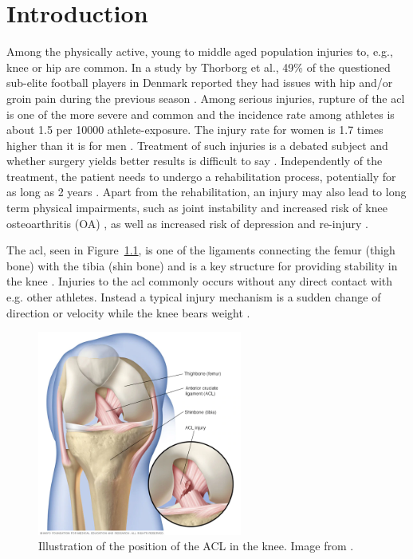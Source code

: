\chapter{Introduction} \label{ch:intro}
Among the physically active, young to middle aged population injuries to, e.g., knee or hip are common. In a study by Thorborg et al., 49\% of the questioned sub-elite football players in Denmark reported they had issues with hip and/or groin pain during the previous season \cite{Thorborg2017}. Among serious injuries, rupture of the \gls{acl} is one of the more severe and common and the incidence rate among athletes is about 1.5 per 10000 athlete-exposure. The injury rate for women is 1.7 times higher than it is for men \cite{Montalvo2019}. Treatment of such injuries is a debated subject and whether surgery yields better results is difficult to say \cite{Krause2018, Monk2016}. Independently of the treatment, the patient needs to undergo a rehabilitation process, potentially for as long as 2 years \cite{Nagelli2017}.
Apart from the rehabilitation, an injury may also lead to long term physical impairments, such as joint instability \cite{Ageberg2002} and increased risk of knee osteoarthritis (OA) \cite{Lohmander2007}, as well as increased risk of depression \cite{Crichlow2006} and re-injury \cite{Paterno2012}.


The \gls{acl}, seen in Figure~\ref{fig:acl}, is one of the ligaments connecting the femur (thigh bone) with the tibia (shin bone) and is a key structure for providing stability in the knee \cite{Duthon2006}. Injuries to the \gls{acl} commonly occurs without any direct contact with e.g. other athletes. Instead a typical injury mechanism is a sudden change of direction or velocity while the knee bears weight \cite{Wetters2016}.

\begin{figure}
  \centering
  \includegraphics[width=0.6\textwidth]{files/figs/intro/acl.png}
  \caption{Illustration of the position of the ACL in the knee. Image from \cite{MayoACL}.}
  \label{fig:acl}
\end{figure}

